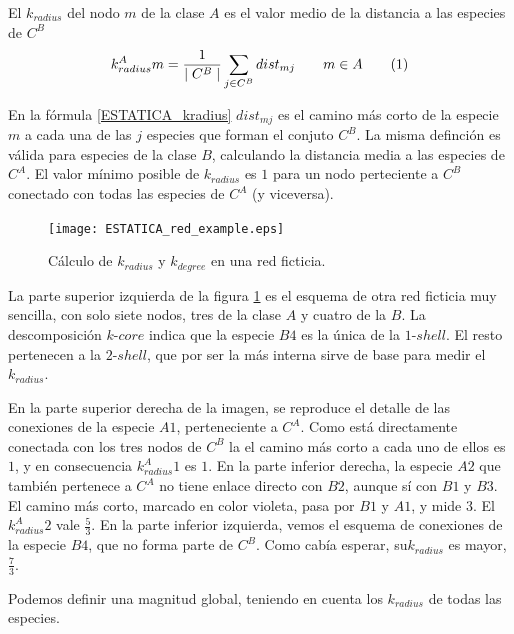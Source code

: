 \begin{theo} 
El \textit{$k_{radius}$} del nodo $m$ de la clase $A$ es el valor medio de la distancia a las especies de $C^B$
\begin{align*}
\displaystyle
k^A_{radius}m = \frac{1}{\mid C^{B} \mid}\sum\limits_{j \in C^{B}} dist_{mj}  \qquad   m \in A
\stepcounter{equation}\tag{\theequation}\label{kradius}
\end{align*}
\label{ESTATICA_kradius}
\end{theo}

En la fórmula \ref{ESTATICA_kradius} $dist_{mj}$ es el camino más corto de la especie $m$ a cada una de las $j$ especies que forman el conjuto $C^B$. La misma definción es válida para especies de la clase $B$, calculando la distancia media a las especies de $C^A$. El valor mínimo posible de $k_{radius}$ es $1$ para un nodo perteciente a $C^B$ conectado con todas las especies de $C^A$ (y viceversa).

\begin{figure}[h!]
\centering
\texttt{[image: ESTATICA\_red\_example.eps]}
\caption {Cálculo de \textit{$k_{radius}$} y  \textit{$k_{degree}$} en una red ficticia.}
\label{fig:ESTATICA_red_example}
\end{figure}

La parte superior izquierda de la figura \ref{fig:ESTATICA_red_example} es el esquema de otra red ficticia muy sencilla, con solo siete nodos, tres de la clase $A$ y cuatro de la $B$. La descomposición $k$-$core$ indica que la especie $B4$ es la única de la $1$-$shell$. El resto pertenecen a la $2$-$shell$, que por ser la más interna sirve de base para medir el $k_{radius}$. 

En la parte superior derecha de la imagen, se reproduce el detalle de las conexiones de la especie $A1$, perteneciente a $C^{A}$.  Como está directamente conectada con los tres nodos de $C^{B}$ la el camino más corto a cada uno de ellos es $1$, y en consecuencia $k^A_{radius}1$ es $1$. En la parte inferior derecha, la especie $A2$ que también pertenece a $C^{A}$ no tiene enlace directo con $B2$, aunque sí con $B1$ y $B3$. El camino más corto, marcado en color violeta, pasa por $B1$ y $A1$, y mide $3$. El $k^A_{radius}2$ vale $\frac{5}{3}$. En la parte inferior izquierda, vemos el esquema de conexiones de la especie $B4$, que no forma parte de $C^{B}$. Como cabía esperar, su$k_{radius}$ es mayor, $\frac{7}{3}$. 

Podemos definir una magnitud global, teniendo en cuenta los $k_{radius}$ de todas las especies.

